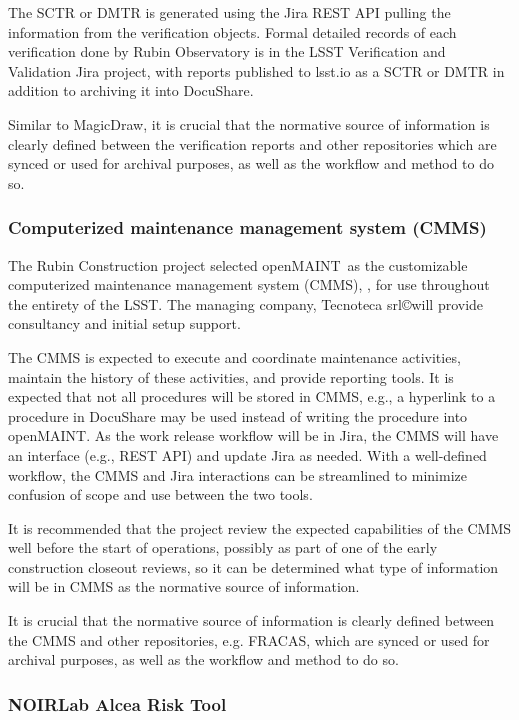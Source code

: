 The SCTR or DMTR is generated using the Jira REST API pulling the information from the verification objects.
Formal detailed records of each verification done by Rubin Observatory is in the LSST Verification and Validation Jira project, with reports published to lsst.io as a SCTR or DMTR in addition to archiving it into DocuShare.

Similar to MagicDraw, it is crucial that the normative source of information is clearly defined between the verification reports and other repositories which are synced or used for archival purposes, as well as the workflow and method to do so.

\subsubsection{Computerized maintenance management system (CMMS)}

The Rubin Construction project selected openMAINT\textregistered\ as the customizable computerized maintenance management system (CMMS), \citep{openmaint-cite}, for use throughout the entirety of the LSST.
The managing company, Tecnoteca srl\copyright will provide consultancy and initial setup support.

The CMMS is expected to execute and coordinate maintenance activities, maintain the history of these activities, and provide reporting tools.
It is expected that not all procedures will be stored in CMMS, e.g., a hyperlink to a procedure in DocuShare may be used instead of writing the procedure into openMAINT.
As the work release workflow will be in Jira, the CMMS will have an interface (e.g., REST API) and update Jira as needed.
With a well-defined workflow, the CMMS and Jira interactions can be streamlined to minimize confusion of scope and use between the two tools.

It is recommended that the project review the expected capabilities of the CMMS well before the start of operations, possibly as part of one of the early construction closeout reviews, so it can be determined what type of information will be in CMMS as the normative source of information.

It is crucial that the normative source of information is clearly defined between the CMMS and other repositories, e.g. FRACAS, which are synced or used for archival purposes, as well as the workflow and method to do so.

\subsubsection{NOIRLab Alcea Risk Tool}

